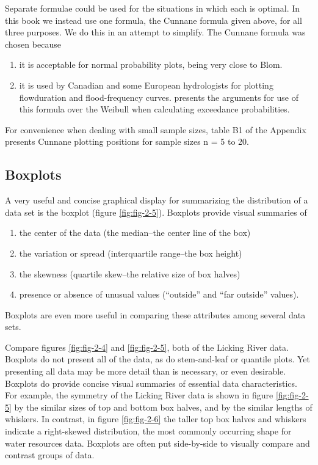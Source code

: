 \documentclass[]{book}
\providecommand{\tightlist}{%
  \setlength{\itemsep}{0pt}\setlength{\parskip}{0pt}}
\begin{document}
Separate formulae could be used for the situations in which each is optimal. In this book we instead use one formula, the Cunnane formula given above, for all three purposes. We do this in an attempt to simplify. The Cunnane formula was chosen because

\begin{enumerate}
\def\labelenumi{\arabic{enumi}.}
\tightlist
\item
  it is acceptable for normal probability plots, being very close to Blom.
\item
  it is used by Canadian and some European hydrologists for plotting flowduration and flood-frequency curves. \citet{cunnane_unbiased_1978} presents the arguments for use of this formula over the Weibull when calculating exceedance probabilities.
\end{enumerate}

For convenience when dealing with small sample sizes, table B1 of the Appendix presents Cunnane plotting positions for sample sizes n = 5 to 20.

\hypertarget{boxplots}{%
\subsection{Boxplots}\label{boxplots}}

A very useful and concise graphical display for summarizing the distribution of a data set is the boxplot (figure \ref{fig:fig-2-5}). Boxplots provide visual summaries of

\begin{enumerate}
\def\labelenumi{\arabic{enumi}.}
\tightlist
\item
  the center of the data (the median--the center line of the box)
\item
  the variation or spread (interquartile range--the box height)
\item
  the skewness (quartile skew--the relative size of box halves)
\item
  presence or absence of unusual values (``outside'' and ``far outside'' values).
\end{enumerate}

Boxplots are even more useful in comparing these attributes among several data sets.

Compare figures \ref{fig:fig-2-4} and \ref{fig:fig-2-5}, both of the Licking River data. Boxplots do not present all of the data, as do stem-and-leaf or quantile plots. Yet presenting all data may be more detail than is necessary, or even desirable. Boxplots do provide concise visual summaries of essential data characteristics. For example, the symmetry of the Licking River data is shown in figure \ref{fig:fig-2-5} by the similar sizes of top and bottom box halves, and by the similar lengths of whiskers. In contrast,
in figure \ref{fig:fig-2-6} the taller top box halves and whiskers indicate a right-skewed distribution, the most commonly occurring shape for water resources data. Boxplots are often put side-by-side to visually compare and contrast groups of data.
\end{document}
